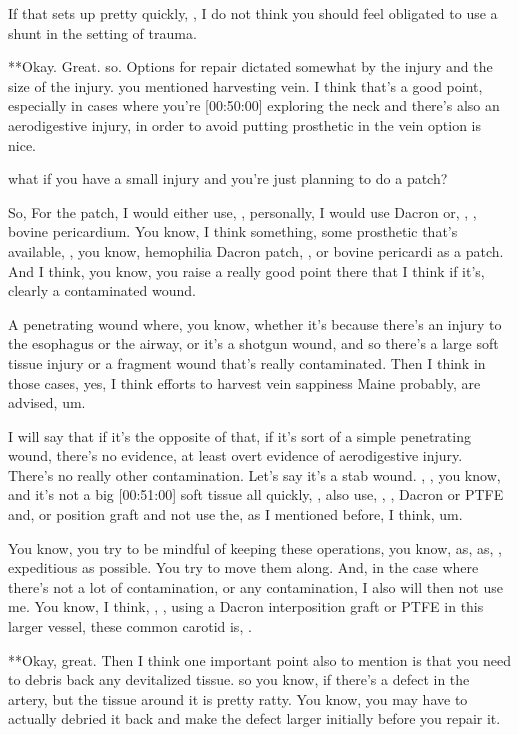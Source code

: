 \documentclass[
]{book}
\begin{document}
If that sets up pretty quickly, , I do not think you should feel
obligated to use a shunt in the setting of trauma.

**Okay. Great. so. Options
for repair dictated somewhat by the injury and the size of the injury.
you mentioned harvesting vein. I think that's a good point,
especially in cases where you're {[}00:50:00{]} exploring the neck and
there's also an aerodigestive injury, in order to avoid putting
prosthetic in the vein option is nice.

what if you have a small injury and you're just planning to do a
patch?

So, For the
patch, I would either use, , personally, I would use Dacron or, , ,
bovine pericardium. You know, I think something, some prosthetic that's
available, , you know, hemophilia Dacron patch, , or bovine pericardi
as a patch. And I think, you know, you raise a really good point
there that I think if it's, clearly a contaminated wound.

A penetrating wound where, you know, whether it's because there's an
injury to the esophagus or the airway, or it's a shotgun wound, and so
there's a large soft tissue injury or a fragment wound that's really
contaminated. Then I think in those cases, yes, I think efforts to
harvest vein sappiness Maine probably, are advised, um.

I will say that if it's the opposite of that, if it's sort of a simple
penetrating wound, there's no evidence, at least overt evidence of
aerodigestive injury. There's no really other contamination. Let's say
it's a stab wound. , , you know, and it's not a big {[}00:51:00{]} soft
tissue all quickly, , also use, , , Dacron or PTFE and, or position
graft and not use the, as I mentioned before, I think, um.

You know, you try to be mindful of keeping these operations, you
know, as, as, , expeditious as possible. You try to move them along.
And, in the case where there's not a lot of contamination, or
any contamination, I also will then not use me. You know, I think, ,
, using a Dacron interposition graft or PTFE in this larger vessel,
these common carotid is, .

**Okay, great. Then I think one
important point also to mention is that you need to debris back any
devitalized tissue. so you know, if there's a defect in the artery,
but the tissue around it is pretty ratty. You know, you may have to
actually debried it back and make the defect larger initially before you
repair it.
\end{document}
